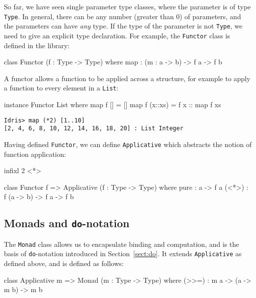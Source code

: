 \label{sec:functor}

So far, we have seen single parameter type classes, where the parameter is of
type \texttt{Type}.  In general, there can be any number (greater than 0) of
parameters, and the parameters can have \emph{any} type.  If the type of the
parameter is not \texttt{Type}, we need to give an explicit type declaration.
For example, the \texttt{Functor} class is defined in the library:

\begin{code}
class Functor (f : Type -> Type) where
    map : (m : a -> b) -> f a -> f b
\end{code}

\noindent
A functor allows a function to be applied across a structure, for example
to apply a function to every element in a \texttt{List}:

\begin{code}
instance Functor List where
  map f []      = []
  map f (x::xs) = f x :: map f xs
\end{code}

\begin{lstlisting}[style=stdout]
Idris> map (*2) [1..10]
[2, 4, 6, 8, 10, 12, 14, 16, 18, 20] : List Integer
\end{lstlisting}

\noindent
Having defined \texttt{Functor}, we can define \texttt{Applicative}
which abstracts the notion of function application:

\begin{code}
infixl 2 <*> 

class Functor f => Applicative (f : Type -> Type) where 
    pure  : a -> f a
    (<*>) : f (a -> b) -> f a -> f b 
\end{code} 

\subsection{Monads and \texttt{do}-notation}

\label{sec:monad}

The \texttt{Monad} class allows us to encapsulate binding and computation, and
is the basis of \texttt{do}-notation introduced in Section~\ref{sect:do}.
It extends \texttt{Applicative} as defined above, and is defined as
follows:

\begin{code}
class Applicative m => Monad (m : Type -> Type) where
    (>>=)  : m a -> (a -> m b) -> m b
\end{code}

